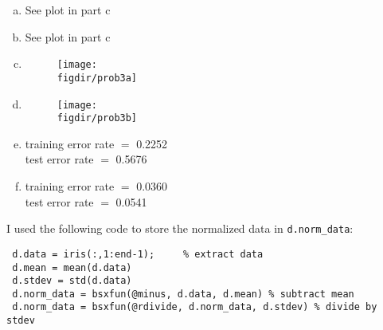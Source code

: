 \documentclass[twoside,11pt]{article}
\newcommand{\figdir}{figs}
\theoremstyle{definition}
\begin{document}
\begin{enumerate}[(a)]
	\item See plot in part c
	\item See plot in part c
	
	\item
		\begin{figure}[H] \centering
		\texttt{[image: \\figdir/prob3a]} \\
		\end{figure}
		
	\item
		\begin{figure}[H] \centering
		\texttt{[image: \\figdir/prob3b]} \\
		\end{figure}

	\item training error rate $=$ 0.2252 \\
		test error rate $=$ 0.5676
	
	\item training error rate $=$ 0.0360 \\
		test error rate $=$ 0.0541
	
\end{enumerate}





I used the following code to store the normalized data in \texttt{d.norm\_data}:\\
\begin{lstlisting}
 d.data = iris(:,1:end-1);     % extract data
 d.mean = mean(d.data)
 d.stdev = std(d.data)
 d.norm_data = bsxfun(@minus, d.data, d.mean) % subtract mean
 d.norm_data = bsxfun(@rdivide, d.norm_data, d.stdev) % divide by stdev
\end{lstlisting}


\end{document}
